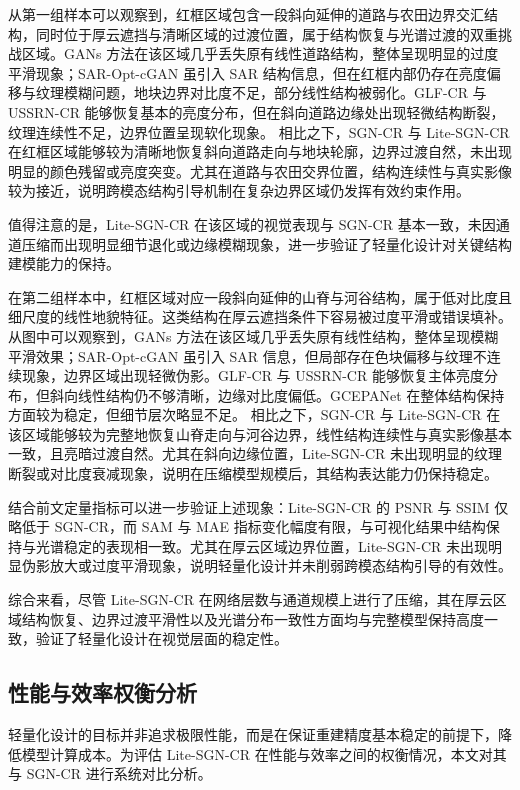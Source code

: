 \begin{figure}[htbp]
\end{figure}

从第一组样本可以观察到，红框区域包含一段斜向延伸的道路与农田边界交汇结构，同时位于厚云遮挡与清晰区域的过渡位置，属于结构恢复与光谱过渡的双重挑战区域。GANs 方法在该区域几乎丢失原有线性道路结构，整体呈现明显的过度平滑现象；SAR-Opt-cGAN 虽引入 SAR 结构信息，但在红框内部仍存在亮度偏移与纹理模糊问题，地块边界对比度不足，部分线性结构被弱化。GLF-CR 与 USSRN-CR 能够恢复基本的亮度分布，但在斜向道路边缘处出现轻微结构断裂，纹理连续性不足，边界位置呈现软化现象。
相比之下，SGN-CR 与 Lite-SGN-CR 在红框区域能够较为清晰地恢复斜向道路走向与地块轮廓，边界过渡自然，未出现明显的颜色残留或亮度突变。尤其在道路与农田交界位置，结构连续性与真实影像较为接近，说明跨模态结构引导机制在复杂边界区域仍发挥有效约束作用。

值得注意的是，Lite-SGN-CR 在该区域的视觉表现与 SGN-CR 基本一致，未因通道压缩而出现明显细节退化或边缘模糊现象，进一步验证了轻量化设计对关键结构建模能力的保持。

在第二组样本中，红框区域对应一段斜向延伸的山脊与河谷结构，属于低对比度且细尺度的线性地貌特征。这类结构在厚云遮挡条件下容易被过度平滑或错误填补。从图中可以观察到，GANs 方法在该区域几乎丢失原有线性结构，整体呈现模糊平滑效果；SAR-Opt-cGAN 虽引入 SAR 信息，但局部存在色块偏移与纹理不连续现象，边界区域出现轻微伪影。GLF-CR 与 USSRN-CR 能够恢复主体亮度分布，但斜向线性结构仍不够清晰，边缘对比度偏低。GCEPANet 在整体结构保持方面较为稳定，但细节层次略显不足。
相比之下，SGN-CR 与 Lite-SGN-CR 在该区域能够较为完整地恢复山脊走向与河谷边界，线性结构连续性与真实影像基本一致，且亮暗过渡自然。尤其在斜向边缘位置，Lite-SGN-CR 未出现明显的纹理断裂或对比度衰减现象，说明在压缩模型规模后，其结构表达能力仍保持稳定。

结合前文定量指标可以进一步验证上述现象：Lite-SGN-CR 的 PSNR 与 SSIM 仅略低于 SGN-CR，而 SAM 与 MAE 指标变化幅度有限，与可视化结果中结构保持与光谱稳定的表现相一致。尤其在厚云区域边界位置，Lite-SGN-CR 未出现明显伪影放大或过度平滑现象，说明轻量化设计并未削弱跨模态结构引导的有效性。

综合来看，尽管 Lite-SGN-CR 在网络层数与通道规模上进行了压缩，其在厚云区域结构恢复、边界过渡平滑性以及光谱分布一致性方面均与完整模型保持高度一致，验证了轻量化设计在视觉层面的稳定性。

\subsection{性能与效率权衡分析}

轻量化设计的目标并非追求极限性能，而是在保证重建精度基本稳定的前提下，降低模型计算成本。为评估 Lite-SGN-CR 在性能与效率之间的权衡情况，本文对其与 SGN-CR 进行系统对比分析。

